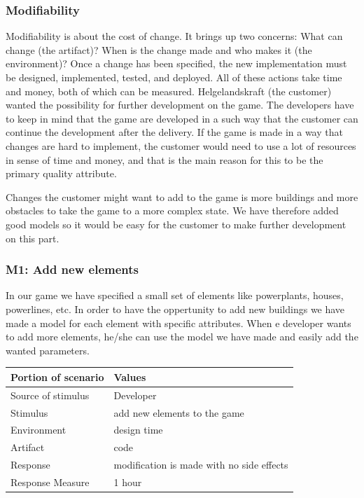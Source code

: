 \subsubsection{Modifiability}

Modifiability is about the cost of change. It brings up two concerns: What can change (the artifact)? 
When is the change made and who makes it (the environment)? 
Once a change has been specified, the new implementation must be designed, 
implemented, tested, and deployed. All of these actions take time and money, both of which can be measured.
Helgelandskraft (the customer) wanted the possibility for further development on the game. The developers
have to keep in mind that the game are developed in a such way that the customer can continue
the development after the delivery. If the game is made in a way that changes are hard to implement, 
the customer would need to use a lot of resources in sense of time and money, and that is the main 
reason for this to be the primary quality attribute.

Changes the customer might want to add to the game is more buildings and more obstacles to take
the game to a more complex state. We have therefore added good models so it would be easy for 
the customer to make further development on this part.

\subsubsection*{M1: Add new elements}
In our game we have specified a small set of elements like powerplants, houses, powerlines, etc.
In order to have the oppertunity to add new buildings we have made a model for each element
with specific attributes. When e developer wants to add more elements, he/she can use the model
we have made and easily add the wanted parameters. 

\begin{tabular}{| l | l |}
	\hline
	{\bf Portion of scenario} & {\bf Values} \\ \hline
	Source of stimulus & Developer\\ \hline
	Stimulus & add new elements to the game\\ \hline
	Environment & design time \\ \hline
	Artifact &  code \\ \hline
	Response & modification is made with no side effects\\ \hline
	Response Measure & 1 hour\\ \hline
\end{tabular}

